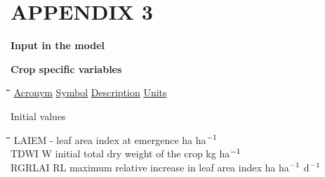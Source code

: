 \documentclass[11pt]{article}
\begin{document}
\setcounter{page}{124}\pagenumpos{\pnbr}
\section{  APPENDIX 3  }

\bigskip
{\bf {\large Input in the model}}

{\bf Crop specific variables}
\nwln
\begin{tabbing}
\hspace{1.27cm}\=\hspace{1.27cm}\=\hspace{1.27cm}\=\hspace{1.27cm}\=%
\hspace{1.27cm}\=\hspace{1.27cm}\=\hspace{1.27cm}\=\hspace{1.27cm}\=%
\hspace{1.27cm}\=\hspace{1.27cm}\=\kill
\uline{Acronym}\> \> \uline{Symbol}\> \uline{Description}\> \> \> \> \> \> \> \uline{Units}
\end{tabbing}

 \bigskip
Initial values\nwln
\begin{tabbing}
\hspace{1.27cm}\=\hspace{1.27cm}\=\hspace{1.27cm}\=\hspace{1.27cm}\=%
\hspace{1.27cm}\=\hspace{1.27cm}\=\hspace{1.27cm}\=\hspace{1.27cm}\=%
\hspace{1.27cm}\=\hspace{1.27cm}\=\kill
LAIEM\> \> -\> leaf area index at emergence\> \> \> \> \> \> \> ha ha$^{{\rm -1}}$\\
TDWI\> \> W\> initial total dry weight of the crop\> \> \> \> \> \> \> kg ha$^{{\rm -1}}$ \\
RGRLAI\> \> RL\> maximum relative increase in leaf area index\> \> \> \> \> \> \> ha ha$^{{\rm -1}}$ d$^{{\rm -1}}$
\end{tabbing}
\end{document}

